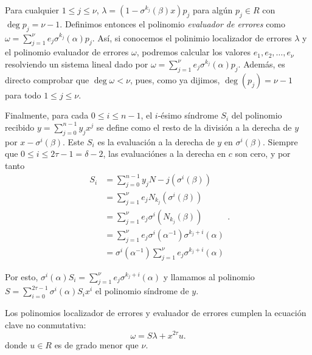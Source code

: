 Para cualquier \(1 \leq j \leq \nu\), \(\lambda = (1 - \sigma^{k_j}(\beta)x)p_j\) para algún \(p_j \in R\) con \(\deg p_j = \nu - 1\). Definimos entonces el polinomio \textit{evaluador de errores} como \(\omega = \sum_{j=1}^\nu e_j \sigma^{k_j}(\alpha)p_j\). Así, si conocemos el polinimio localizador de errores \(\lambda\) y el polinomio evaluador de errores \(\omega\), podremos calcular los valores \(e_1, e_2, \ldots, e_{\nu}\) resolviendo un sistema lineal dado por \(\omega = \sum_{j=1}^{\nu} e_j \sigma^{k_j}(\alpha)p_j\). Además, es directo comprobar que \(\deg \omega < \nu\), pues, como ya dijimos, \(\deg(p_j) = \nu -1\) para todo \(1 \le j \le \nu\).

Finalmente, para cada \(0 \leq i \leq n-1\), el \(i\)-ésimo síndrome \(S_i\) del polinomio recibido  \(y = \sum_{j=0}^{n-1} y_j x^j\) se define como el resto de la división a la derecha de  \(y\) por  \(x - \sigma^i(\beta)\). Este \(S_i\) es la evaluación a la derecha de \(y\) en  \(\sigma^i(\beta)\). Siempre que \(0 \leq i \leq 2\tau -1 = \delta -2\), las evaluaciónes a la derecha en \(c\) son cero, y por tanto
 \[
\begin{aligned}
    S_i &= \sum_{j=0}^{n-1} y_j N-j(\sigma^i(\beta)) \\
    &= \sum_{j=1}^\nu e_j N_{k_j}(\sigma^i(\beta))\\
    &= \sum_{j=1}^\nu e_j \sigma^i(N_{k_j}(\beta))\\
    &= \sum_{j=1}^\nu e_j \sigma^i(\alpha^{-1})\sigma^{k_j + i}(\alpha)\\
    &= \sigma^i(\alpha^{-1})\sum_{j=1}^\nu e_j \sigma^{k_j + i}(\alpha)
\end{aligned}
.\]

Por esto, \(\sigma^i(\alpha)S_i = \sum_{j=1}^\nu e_j \sigma^{k_j + i}(\alpha)\) y llamamos al polinomio \(S = \sum_{i=0}^{2\tau -1} \sigma^i(\alpha) S_i x^i\) el polinomio síndrome de \(y\).

\begin{theorem}
    Los polinomios localizador de errores y evaluador de errores cumplen la ecuación clave no conmutativa:
    \[
    \omega = S\lambda + x^{2\tau}u.
    \]
    donde \(u \in R\) es de grado menor que \(\nu\).
\end{theorem}

